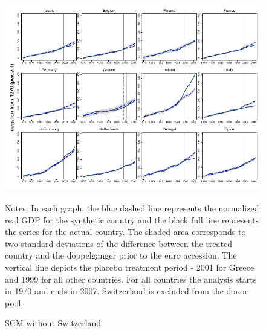 \documentclass[12pt]{article}
\newcommand{\annote}[1]{\parbox{\textwidth}{\renewcommand{\baselinestretch}{1.0}\vspace{12pt} \small Notes: #1}}
\begin{document}
\begin{appendices}
\begin{figure}[h!]
    \centering
    \label{F_CHE}
    \caption{SCM without Switzerland}
    \includegraphics[scale=0.7]{Output/Figures/SCM_gdp_Rob_1999_Annual_CHE.pdf}
         \annote{In each graph, the blue dashed line represents the normalized real GDP for the synthetic country and the black full line represents the series for the actual country. The shaded area corresponds to two standard deviations of the difference between the treated country and the doppelganger prior to the euro accession. The vertical line depicts the placebo treatment period - 2001 for Greece and 1999 for all other countries. For all countries the analysis starts in 1970 and ends in 2007. Switzerland is excluded from the donor pool. }
\end{figure}



\end{appendices}
\end{document}
